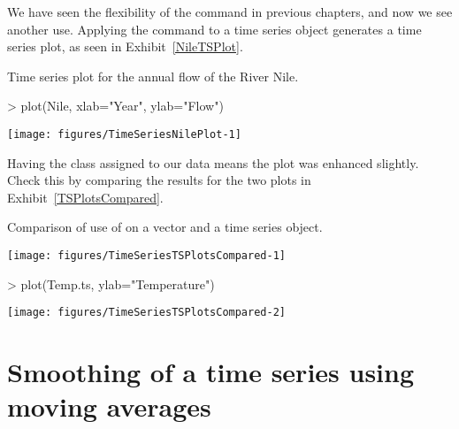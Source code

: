 We have seen the flexibility of the  command in previous chapters, and now we see another use. Applying the  command to a time series object generates a time series plot, as seen in Exhibit~\ref{NileTSPlot}. 
\begin{exhibit} 
\begin{center} 
\caption{Time series plot for the annual flow of the River Nile.} 
\label{NileTSPlot} 

\begin{Schunk}
\begin{Sinput}
> plot(Nile, xlab="Year", ylab="Flow") 
\end{Sinput}

\texttt{[image: figures/TimeSeriesNilePlot-1]} \end{Schunk}

\end{center} 
\end{exhibit} 
 
Having the class assigned to our data means the plot was enhanced slightly. Check this by comparing the results for the two plots in Exhibit~\ref{TSPlotsCompared}. 
\begin{exhibit} 
\begin{center} 
\caption{Comparison of use of  on a vector and a time series object.} 
\label{TSPlotsCompared} 

\begin{Schunk}

\texttt{[image: figures/TimeSeriesTSPlotsCompared-1]} \begin{Sinput}
> plot(Temp.ts, ylab="Temperature") 
\end{Sinput}

\texttt{[image: figures/TimeSeriesTSPlotsCompared-2]} \end{Schunk}

\end{center} 
\end{exhibit} 
 
\section{Smoothing of a time series using moving averages} 
 
